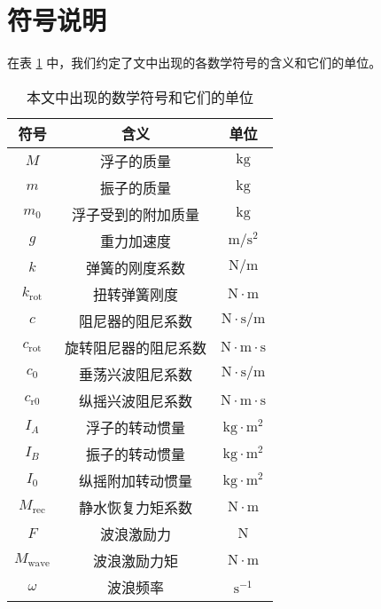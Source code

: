 \section{符号说明}

在表 \ref{symbols} 中，我们约定了文中出现的各数学符号的含义和它们的单位。

\begin{table}[htbp]
    \centering
    \begin{tabular}{ccc}
        \toprule
        符号 & 含义 & 单位 \\
        \midrule
        $M$ & 浮子的质量 & $\mathrm{kg}$ \\
        $m$ & 振子的质量 & $\mathrm{kg}$ \\
        $m_0$ & 浮子受到的附加质量 & $\mathrm{kg}$ \\
        $g$ & 重力加速度 & $\mathrm{m}/\mathrm{s}^2$ \\
        $k$ & 弹簧的刚度系数 & $\mathrm{N}/\mathrm{m}$ \\
        $k_\text{rot}$ & 扭转弹簧刚度 & $\mathrm{N}\cdot\mathrm{m}$ \\
        $c$ & 阻尼器的阻尼系数 & $\mathrm{N}\cdot\mathrm{s}/\mathrm{m}$ \\
        $c_\text{rot}$ & 旋转阻尼器的阻尼系数 & $\mathrm{N}\cdot\mathrm{m}\cdot\mathrm{s}$ \\
        $c_0$ & 垂荡兴波阻尼系数 & $\mathrm{N}\cdot\mathrm{s}/\mathrm{m}$ \\ 
        $c_\text{r0}$ & 纵摇兴波阻尼系数 & $\mathrm{N}\cdot\mathrm{m}\cdot\mathrm{s}$ \\
        $I_A$ & 浮子的转动惯量 & $\mathrm{kg}\cdot\mathrm{m}^2$ \\
        $I_B$ & 振子的转动惯量 & $\mathrm{kg}\cdot\mathrm{m}^2$ \\
        $I_0$ & 纵摇附加转动惯量 & $\mathrm{kg}\cdot\mathrm{m}^2$ \\
        $M_\text{rec}$ & 静水恢复力矩系数 & $\mathrm{N}\cdot\mathrm{m}$ \\
        $F$ & 波浪激励力 & $\mathrm{N}$ \\
        $M_\text{wave}$ & 波浪激励力矩 & $\mathrm{N}\cdot\mathrm{m}$ \\
        $\omega$ & 波浪频率 & $\mathrm{s}^{-1}$ \\
        \bottomrule 
    \end{tabular}
    \caption{本文中出现的数学符号和它们的单位}
    \label{symbols}
\end{table}

